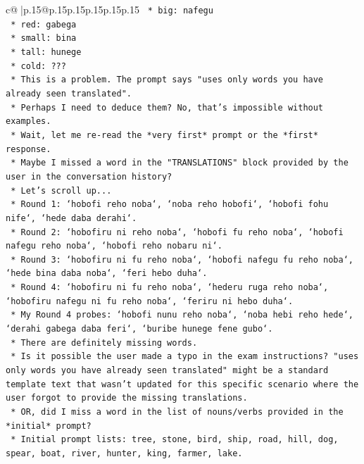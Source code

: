 \documentclass{article}
\begin{document}
{\begin{supertabular}{c@{$\;$}|p{.15\linewidth}@{}p{.15\linewidth}p{.15\linewidth}p{.15\linewidth}p{.15\linewidth}p{.15\linewidth}}
{{{\texttt{                *   big: nafegu} \\
\texttt{                *   red: gabega} \\
\texttt{                *   small: bina} \\
\texttt{                *   tall: hunege} \\
\texttt{                *   cold: ???} \\
\texttt{            *   This is a problem. The prompt says "uses only words you have already seen translated".} \\
\texttt{            *   Perhaps I need to deduce them? No, that's impossible without examples.} \\
\texttt{            *   Wait, let me re{-}read the *very first* prompt or the *first* response.} \\
\texttt{            *   Maybe I missed a word in the "TRANSLATIONS" block provided by the user in the conversation history?} \\
\texttt{            *   Let's scroll up...} \\
\texttt{            *   Round 1: `hobofi reho noba`, `noba reho hobofi`, `hobofi fohu nife`, `hede daba derahi`.} \\
\texttt{            *   Round 2: `hobofiru ni reho noba`, `hobofi fu reho noba`, `hobofi nafegu reho noba`, `hobofi reho nobaru ni`.} \\
\texttt{            *   Round 3: `hobofiru ni fu reho noba`, `hobofi nafegu fu reho noba`, `hede bina daba noba`, `feri hebo duha`.} \\
\texttt{            *   Round 4: `hobofiru ni fu reho noba`, `hederu ruga reho noba`, `hobofiru nafegu ni fu reho noba`, `feriru ni hebo duha`.} \\
\texttt{            *   My Round 4 probes: `hobofi nunu reho noba`, `noba hebi reho hede`, `derahi gabega daba feri`, `buribe hunege fene gubo`.} \\
\texttt{            *   There are definitely missing words.} \\
\texttt{            *   Is it possible the user made a typo in the exam instructions? "uses only words you have already seen translated" might be a standard template text that wasn't updated for this specific scenario where the user forgot to provide the missing translations.} \\
\texttt{            *   OR, did I miss a word in the list of nouns/verbs provided in the *initial* prompt?} \\
\texttt{            *   Initial prompt lists: tree, stone, bird, ship, road, hill, dog, spear, boat, river, hunter, king, farmer, lake.} \\
}}}
\end{supertabular}}
\end{document}
